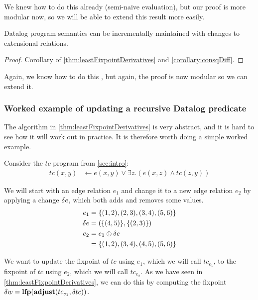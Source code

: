 We knew how to do this already (semi-naive evaluation), but our proof is more
modular now, so we will be able to extend this result more easily.

\begin{thm}
\label{thm:diffUpdate}
  Datalog program semantics can be incrementally maintained with changes to
  extensional relations.
\end{thm}
\ifproofs
\begin{proof}
  Corollary of \cref{thm:leastFixpointDerivatives} and \cref{corollary:consqDiff}.
\end{proof}
\fi

Again, we know how to do this \autocite[see][and successors]{gupta1993maintaining},
but again, the proof is now modular so we can extend it.

\subsubsection{Worked example of updating a recursive Datalog predicate}
\label{sec:workedExample}

The algorithm in \cref{thm:leastFixpointDerivatives} is very abstract, and it is
hard to see how it will work out in practice. It is therefore worth doing a
simple worked example.


Consider the $tc$ program from \cref{sec:intro}:
\begin{align*}
  tc(x, y) &\leftarrow e(x, y) \vee \exists z.(e(x, z) \wedge tc(z, y))
\end{align*}

We will start with an edge relation $e_1$ and change it to a new edge relation
$e_2$ by applying a change $\delta e$, which both adds and removes some values.
\begin{align*}
  e_1 &= \{(1,2), (2,3), (3,4), (5,6) \}\\
  \delta e &= (\{(4,5)\}, \{(2,3)\})\\
  e_2 &= e_1 \oplus \delta e\\
      &=\{ (1,2), (3,4), (4,5), (5,6) \}
\end{align*}

We want to update the fixpoint of $tc$ using $e_1$, which we will call
$tc_{e_1}$,  to the fixpoint of $tc$ using $e_2$, which we will call $tc_{e_2}$.
As we have seen in \cref{thm:leastFixpointDerivatives},
we can do this by computing the fixpoint $\delta w = \mathbf{lfp}(\mathbf{adjust}(tc_{e_1}, \delta tc))$. 

